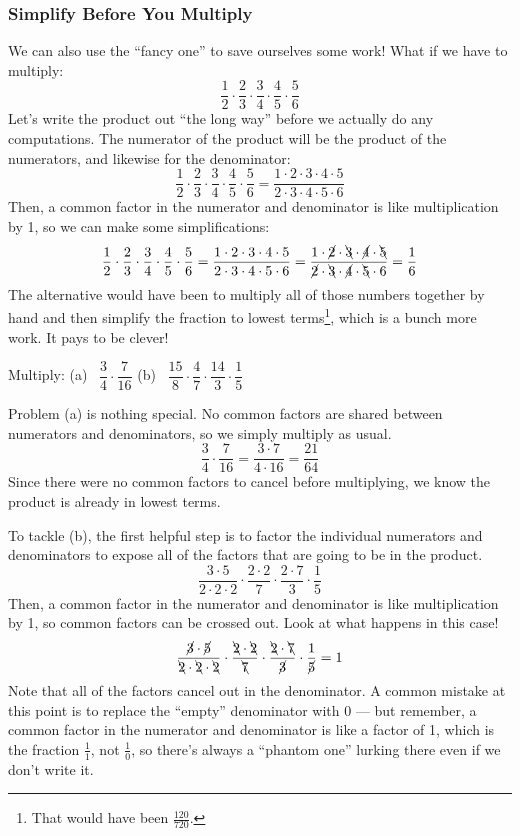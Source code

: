 \subsubsection*{Simplify Before You Multiply}

We can also use the ``fancy one'' to save ourselves some work! What if we have to multiply:
\[\frac{1}{2} \cdot \frac{2}{3} \cdot \frac{3}{4} \cdot \frac{4}{5} \cdot \frac{5}{6}\]
Let's write the product out ``the long way'' before we actually do any computations. The numerator of the product will be the product of the numerators, and likewise for the denominator:
\[\frac{1}{2} \cdot \frac{2}{3} \cdot \frac{3}{4} \cdot \frac{4}{5} \cdot \frac{5}{6} = \frac{1 \cdot 2 \cdot 3 \cdot 4 \cdot 5}{2 \cdot 3 \cdot 4 \cdot 5 \cdot 6}\]
Then, a common factor in the numerator and denominator is like multiplication by 1, so we can make some simplifications:
\[\frac{1}{2} \cdot \frac{2}{3} \cdot \frac{3}{4} \cdot \frac{4}{5} \cdot \frac{5}{6} = \frac{1 \cdot 2 \cdot 3 \cdot 4 \cdot 5}{2 \cdot 3 \cdot 4 \cdot 5 \cdot 6} = \frac{1 \cdot \cancel{2} \cdot \bcancel{3} \cdot \cancel{4} \cdot \bcancel{5}}{\cancel{2} \cdot \bcancel{3} \cdot \cancel{4} \cdot \bcancel{5} \cdot 6} = \frac{1}{6}\]
The alternative would have been to multiply all of those numbers together by hand and then simplify the fraction to lowest terms\footnote{That would have been $\frac{120}{720}$.}, which is a bunch more work. It pays to be clever!

\begin{boxedex}
Multiply: (a)~ $\dfrac{3}{4} \cdot \dfrac{7}{16}$ \quad (b)~ $\dfrac{15}{8}\cdot\dfrac{4}{7}\cdot\dfrac{14}{3}\cdot\dfrac{1}{5}$

Problem (a) is nothing special. No common factors are shared between numerators and denominators, so we simply multiply as usual.\[\frac{3}{4} \cdot \frac{7}{16} = \frac{3 \cdot 7}{4 \cdot 16} = \frac{21}{64}\] Since there were no common factors to cancel before multiplying, we know the product is already in lowest terms.

To tackle (b), the first helpful step is to factor the individual numerators and denominators to expose all of the factors that are going to be in the product. \[\frac{3\cdot 5}{2 \cdot 2 \cdot 2} \cdot \frac{2 \cdot 2}{7} \cdot \frac{2 \cdot 7}{3} \cdot \frac{1}{5}\]
Then, a common factor in the numerator and denominator is like multiplication by 1, so common factors can be crossed out. Look at what happens in this case!
\[\frac{\cancel{3}\cdot \cancel{5}}{\bcancel{2} \cdot \bcancel{2} \cdot \bcancel{2}} \cdot \frac{\bcancel{2} \cdot \bcancel{2}}{\bcancel{7}} \cdot \frac{\bcancel{2} \cdot \bcancel{7}}{\cancel{3}} \cdot \frac{1}{\cancel{5}} = 1\]
Note that all of the factors cancel out in the denominator. A common mistake at this point is to replace the ``empty'' denominator with 0 --- but remember, a common factor in the numerator and denominator is like a factor of 1, which is the fraction $\frac{1}{1}$, not $\frac{1}{0}$, so there's always a ``phantom one'' lurking there even if we don't write it.
\end{boxedex}

